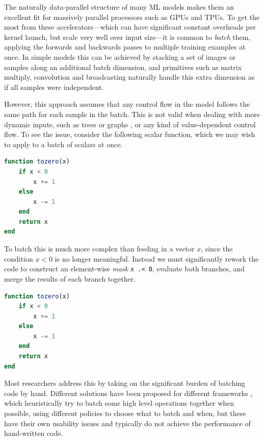 \documentclass{juliacon}
\begin{document}
The naturally data-parallel structure of many ML models makes them an excellent fit for massively parallel processors such as GPUs \cite{oh2004gpu} and TPUs. To get the most from these accelerators---which can have significant constant overheads per kernel launch, but scale very well over input size---it is common to \textit{batch} them, applying the forwards and backwards passes to multiple training examples at once. In simple models this can be achieved by stacking a set of images or samples along an additional batch dimension, and primitives such as matrix multiply, convolution and broadcasting naturally handle this extra dimension as if all samples were independent.

However, this approach assumes that any control flow in the model follows the same path for each sample in the batch. This is not valid when dealing with more dynamic inputs, such as trees \cite{treelstm} or graphs \cite{graphconv}, or any kind of value-dependent control flow. To see the issue, consider the following scalar function, which we may wish to apply to a batch of scalars at once.

\begin{lstlisting}[language = Julia,
                  label={lst:not_spmd},
                  caption={\texttt{tozero()} is a simple scalar function},
                  captionpos=b]
function tozero(x)
    if x < 0
        x += 1
    else
        x -= 1
    end
    return x
end
\end{lstlisting}

To batch this is much more complex than feeding in a vector $x$, since the condition $x < 0$ is no longer meaningful. Instead we must significantly rework the code to construct an element-wise \textit{mask} \texttt{x .< 0}, evaluate both branches, and merge the results of each branch together.

\begin{lstlisting}[language = Julia,
                  label={lst:spmd},
                  caption={\texttt{spmd()} is a version of \texttt{notspmd()} that works on batches of inputs},
                  captionpos=b]
function tozero(x)
    if x < 0
        x += 1
    else
        x -= 1
    end
    return x
end
\end{lstlisting}

Most researchers address this by taking on the significant burden of batching code by hand. Different solutions have been proposed for different frameworks \cite{neubig2017fly} \cite{looks2017deep}, which heuristically try to batch some high level operations together when possible, using different policies to choose what to batch and when, but these have their own usability issues and typically do not achieve the performance of hand-written code.
\end{document}

